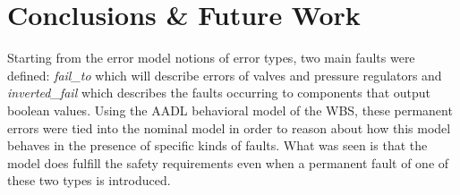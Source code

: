 \section{Conclusions \& Future Work}
Starting from the error model notions of error types, two main faults were defined: \textit{fail\_to} which will describe errors of valves and pressure regulators and \textit{inverted\_fail} which describes the faults occurring to components that output boolean values. Using the AADL behavioral model of the WBS, these permanent errors were tied into the nominal model in order to reason about how this model behaves in the presence of specific kinds of faults. What was seen is that the model does fulfill the safety requirements even when a permanent fault of one of these two types is introduced. 




